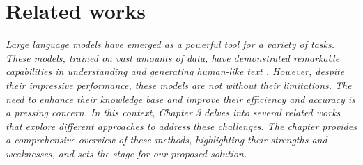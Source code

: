 \chapter{Related works}
\indent\textit{Large language models have emerged as a powerful tool for a variety of tasks. These models, trained on vast amounts of data, have demonstrated remarkable capabilities in understanding and generating human-like text \cite{NEURIPS2020_1457c0d6}. However, despite their impressive performance, these models are not without their limitations. The need to enhance their knowledge base and improve their efficiency and accuracy is a pressing concern. In this context, Chapter 3 delves into several related works that explore different approaches to address these challenges. The chapter provides a comprehensive overview of these methods, highlighting their strengths and weaknesses, and sets the stage for our proposed solution. }







% 
% 
% 
% 